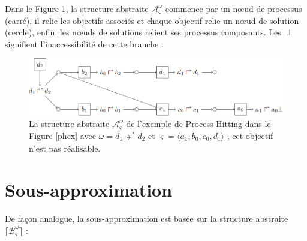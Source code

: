 \documentclass[11pt]{report}
\theoremstyle{definition}
\begin{document}
Dans le Figure \ref{overapp}, la structure abstraite $\mathcal{A}^\omega_\varsigma$ commence par un n\oe ud de processus (carr\'e), il relie les objectifs associ\'es et chaque objectif relie un n\oe ud de solution (cercle), enfin, les n\oe uds de solutions relient ses processus composants. Les $\perp$ signifient l'inaccessibilit\'e de cette branche \citep{Pauleve2012}.
\begin{figure}[ht]
\centering
\includegraphics[scale=0.6]{overapp.png}
\caption{La structure abstraite $\mathcal{A}^\omega_\varsigma$ de l'exemple de Process Hitting dans le Figure \ref{phex} avec $\omega=d_1\Rsh^*d_2$ et $\varsigma=\langle a_1,b_0,c_0,d_1\rangle$ , cet objectif n'est pas r\'ealisable.}\label{overapp}
\end{figure}
\section{Sous-approximation}
De fa\c con analogue, la sous-approximation est bas\'ee sur la structure abstraite $\lceil\mathcal{B}^\omega_\varsigma\rceil$ : 
\end{document}
